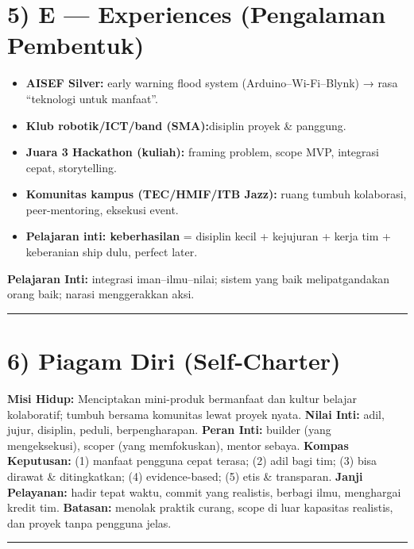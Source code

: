 \documentclass[
  letterpaper,
  DIV=11,
  numbers=noendperiod]{scrreprt}
\begin{document}
\section{5) E --- Experiences (Pengalaman
Pembentuk)}\label{e-experiences-pengalaman-pembentuk}

\begin{itemize}
\item
  \textbf{AISEF Silver:} early warning flood system
  (Arduino--Wi-Fi--Blynk) → rasa ``teknologi untuk manfaat''.
\item
  \textbf{Klub robotik/ICT/band (SMA):}disiplin proyek \& panggung.
\item
  \textbf{Juara 3 Hackathon (kuliah):} framing problem, scope MVP,
  integrasi cepat, storytelling.
\item
  \textbf{Komunitas kampus (TEC/HMIF/ITB Jazz):} ruang tumbuh
  kolaborasi, peer-mentoring, eksekusi event.
\item
  \textbf{Pelajaran inti: keberhasilan} = disiplin kecil + kejujuran +
  kerja tim + keberanian ship dulu, perfect later.
\end{itemize}

\textbf{Pelajaran Inti:} integrasi iman--ilmu--nilai; sistem yang baik
melipatgandakan orang baik; narasi menggerakkan aksi.

\begin{center}\rule{0.5\linewidth}{0.5pt}\end{center}

\section{6) Piagam Diri (Self‑Charter)}\label{piagam-diri-selfcharter}

\textbf{Misi Hidup:} Menciptakan mini-produk bermanfaat dan kultur
belajar kolaboratif; tumbuh bersama komunitas lewat proyek nyata.
\textbf{Nilai Inti:} adil, jujur, disiplin, peduli, berpengharapan.
\textbf{Peran Inti:} builder (yang mengeksekusi), scoper (yang
memfokuskan), mentor sebaya. \textbf{Kompas Keputusan:} (1) manfaat
pengguna cepat terasa; (2) adil bagi tim; (3) bisa dirawat \&
ditingkatkan; (4) evidence-based; (5) etis \& transparan. \textbf{Janji
Pelayanan:} hadir tepat waktu, commit yang realistis, berbagi ilmu,
menghargai kredit tim. \textbf{Batasan:} menolak praktik curang, scope
di luar kapasitas realistis, dan proyek tanpa pengguna jelas.

\begin{center}\rule{0.5\linewidth}{0.5pt}\end{center}
\end{document}
